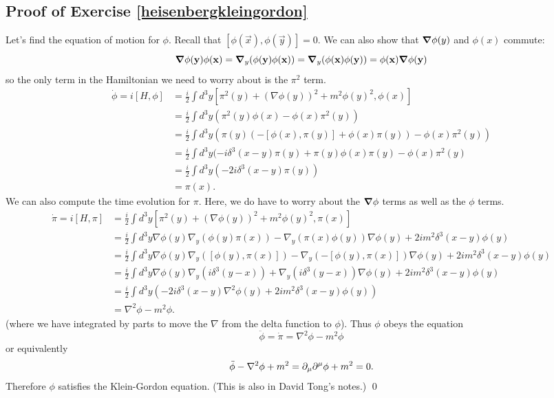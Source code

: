 \subsection*{Proof of Exercise \ref{heisenbergkleingordon}}
Let's find the equation of motion for $\phi.$ Recall that $[\phi(\vec x),\phi(\vec y)]=0$. We can also show that $\mbox{\boldmath$ \nabla $} \phi(y)$ and $\phi(x)$ commute: 
$$
\mbox{\boldmath$ \nabla $} \phi(\boldsymbol{\mathbf{y}})\phi(\boldsymbol{\mathbf{x}}) = \mbox{\boldmath$ \nabla $} _y (\phi(\boldsymbol{\mathbf{y}}) \phi (\boldsymbol{\mathbf{x}})) = \mbox{\boldmath$ \nabla $} _y (\phi(\boldsymbol{\mathbf{x}}) \phi(\boldsymbol{\mathbf{y}})) = \phi (\boldsymbol{\mathbf{x}}) \mbox{\boldmath$ \nabla $} \phi (\boldsymbol{\mathbf{y}})$$
so the only term in the Hamiltonian we need to worry about is the $\pi^2$ term.
\begin{align*}
\dot \phi = i[H,\phi] &=\frac{i}{2} \int d^3 y \left[\pi^2(y)+(\nabla \phi(y))^2 + m^2\phi(y)^2, \phi(x)\right]\\
&=\frac{i}{2} \int d^3 y (\pi^2(y) \phi(x) - \phi(x) \pi^2(y))\\
&=\frac{i}{2} \int d^3 y (\pi(y) (-[\phi(x),\pi(y)]+\phi(x) \pi(y))-\phi(x) \pi^2(y))\\
&=\frac{i}{2} \int d^3 y (-i\delta^3(x-y) \pi(y)+ \pi(y) \phi(x) \pi(y) - \phi(x) \pi^2(y)\\
&=\frac{i}{2} \int d^3 y (-2i \delta^3(x-y) \pi(y))\\
&= \pi(x).
\end{align*}
We can also compute the time evolution for $\pi$. Here, we do have to worry about the $\mbox{\boldmath$ \nabla $} \phi$ terms as well as the $\phi$ terms.
\begin{align*}
\dot \pi = i[H,\pi] &=\frac{i}{2} \int d^3 y \left[\pi^2(y)+(\nabla \phi(y))^2 + m^2\phi(y)^2, \pi(x)\right]\\
&=\frac{i}{2} \int d^3 y \nabla \phi(y) \nabla_y (\phi(y) \pi(x))- \nabla_y (\pi(x) \phi(y)) \nabla \phi(y)+2i m^2 \delta^3(x-y) \phi(y)\\
&= \frac{i}{2} \int d^3 y \nabla \phi(y) \nabla_y([ \phi(y),\pi(x)]) - \nabla_y(-[\phi(y),\pi(x)]) \nabla \phi(y)+2i m^2 \delta^3(x-y) \phi(y)\\
&=\frac{i}{2} \int d^3 y \nabla \phi(y) \nabla_y(i\delta^3(y-x)) + \nabla_y(i\delta^3(y-x)) \nabla \phi(y)+2i m^2 \delta^3(x-y) \phi(y)\\
&= \frac{i}{2} \int d^3 y \left(-2i \delta^3(x-y) \nabla^2 \phi(y) + 2i m^2 \delta^3(x-y) \phi(y) \right)\\
&= \nabla^2 \phi-m^2 \phi.
\end{align*}
(where we have integrated by parts to move the $\nabla$ from the delta function to $\phi$). Thus $\phi$ obeys the equation
$$\ddot \phi = \dot \pi = \nabla^2 \phi - m^2 \phi$$
or equivalently
$$\ddot \phi - \nabla^2 \phi + m^2 = \partial_\mu \partial^\mu \phi +m^2=0.$$
Therefore $\phi$ satisfies the Klein-Gordon equation. (This is also in David Tong's notes.) \qed

